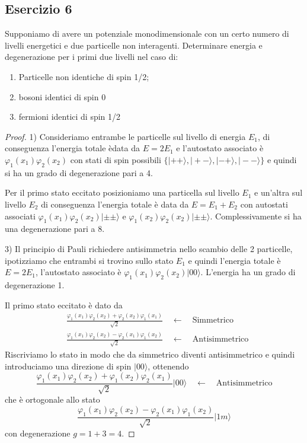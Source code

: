 \subsection{Esercizio 6}

Supponiamo di avere un potenziale monodimensionale con un certo numero di livelli energetici e due particelle non interagenti. Determinare energia e degenerazione per i primi due livelli nel caso di:
\begin{enumerate}
	\item Particelle non identiche di spin 1/2;
	\item bosoni identici di spin 0
	\item fermioni identici di spin 1/2
\end{enumerate}
\begin{proof}
	1) Consideriamo entrambe le particelle sul livello di energia $E_1$, di conseguenza l'energia totale \`edata da $E = 2E_1$ e l'autostato associato \`e $\varphi_1(x_1)\varphi_2(x_2)$ con stati di spin possibili $\{|++\rangle, |+-\rangle,|-+\rangle,|--\rangle \}$ e quindi si ha un grado di degenerazione pari a 4.
	
	Per il primo stato eccitato posizioniamo una particella sul livello $E_1$ e un'altra sul livello $E_2$ di conseguenza l'energia totale \`e data da $E = E_1 + E_2$ con autostati associati $\varphi_1(x_1) \varphi_2(x_2)|\pm \pm \rangle$ e $\varphi_1(x_2)\varphi_2(x_2)|\pm \pm \rangle $. Complessivamente si ha una degenerazione pari a 8.
\newline

	3) Il principio di Pauli richiedere antisimmetria nello scambio delle 2 particelle, ipotizziamo che entrambi si trovino sullo stato $E_1$ e quindi l'energia totale \`e $E = 2E_1$, l'autostato associato \`e $\varphi_1(x_1)\varphi_2(x_2) |00\rangle $. L'energia ha un grado di degenerazione 1.
\newpage

Il primo stato eccitato \`e dato da 
\begin{align*}
	& \frac{\varphi_1(x_1)\varphi_2(x_2)+\varphi_2(x_2)\varphi_1(x_1)}{\sqrt{2}} \quad \leftarrow \quad \text{Simmetrico} \\[0.5cm] 
	& \frac{\varphi_1(x_1)\varphi_2(x_2) - \varphi_2(x_1)\varphi_1(x_2)}{\sqrt{2}} \quad \leftarrow \quad \text{Antisimmetrico} 
\end{align*}
Riscriviamo lo stato in modo che da simmetrico diventi antisimmetrico e quindi introduciamo una direzione di spin $|00\rangle$, ottenendo
\begin{equation*}
	\frac{\varphi_1(x_1)\varphi_2(x_2) + \varphi_1(x_2)\varphi_2(x_1)}{\sqrt{2}}|00\rangle \quad \leftarrow \quad \text{Antisimmetrico}
\end{equation*}
che \`e ortogonale allo stato 
\begin{equation*}
	\frac{\varphi_1(x_1)\varphi_2(x_2)-\varphi_2(x_1)\varphi_1(x_2)}{\sqrt{2}}|1m \rangle 
\end{equation*}
con degenerazione $g = 1 + 3 = 4$.
\newline


\end{proof}
